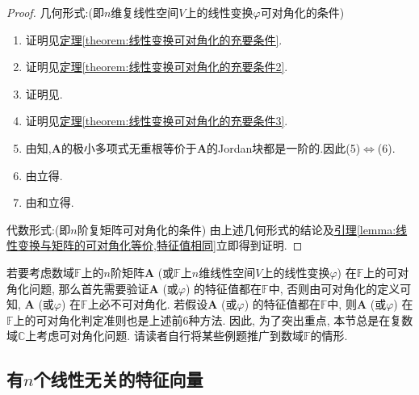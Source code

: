 \documentclass[../../main.tex]{subfiles}
\begin{document}
\begin{proof}
{\heiti 几何形式:}(即\(n\)维复线性空间\(V\)上的线性变换\(\varphi\)可对角化的条件)
\begin{enumerate}[(1)]
\item 证明见\hyperref[theorem:线性变换可对角化的充要条件]{定理\ref{theorem:线性变换可对角化的充要条件}}.

\item 证明见\hyperref[theorem:线性变换可对角化的充要条件2]{定理\ref{theorem:线性变换可对角化的充要条件2}}.

\item 证明见.

\item 证明见\hyperref[theorem:线性变换可对角化的充要条件3]{定理\ref{theorem:线性变换可对角化的充要条件3}}.

\item 由知,$\boldsymbol{A}$的极小多项式无重根等价于$\boldsymbol{A}$的Jordan块都是一阶的.因此(5)$\iff$(6).

\item 由立得.

\item 由和立得.
\end{enumerate}
{\heiti 代数形式:}(即\(n\)阶复矩阵可对角化的条件)
由上述几何形式的结论及\hyperref[lemma:线性变换与矩阵的可对角化等价,特征值相同]{引理\ref{lemma:线性变换与矩阵的可对角化等价,特征值相同}}立即得到证明.
\end{proof}
\begin{remark}
若要考虑数域\(\mathbb{F}\)上的\(n\)阶矩阵\(\boldsymbol{A}\) (或\(\mathbb{F}\)上\(n\)维线性空间\(V\)上的线性变换\(\varphi\)) 在\(\mathbb{F}\)上的可对角化问题, 那么首先需要验证\(\boldsymbol{A}\) (或\(\varphi\)) 的特征值都在\(\mathbb{F}\)中, 否则由可对角化的定义可知, \(\boldsymbol{A}\) (或\(\varphi\)) 在\(\mathbb{F}\)上必不可对角化. 若假设\(\boldsymbol{A}\) (或\(\varphi\)) 的特征值都在\(\mathbb{F}\)中, 则\(\boldsymbol{A}\) (或\(\varphi\)) 在\(\mathbb{F}\)上的可对角化判定准则也是上述前\(6\)种方法. 因此, 为了突出重点, 本节总是在复数域\(\mathbb{C}\)上考虑可对角化问题. 请读者自行将某些例题推广到数域\(\mathbb{F}\)的情形. 
\end{remark}



\subsection{有$n$个线性无关的特征向量}
\end{document}
